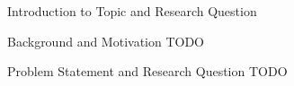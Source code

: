 \begin{section}{Introduction to Topic and Research Question}
\begin{subsection}{Background and Motivation}
    TODO
\end{subsection}
\begin{subsection}{Problem Statement and Research Question}
    TODO
\end{subsection}
\end{section}
